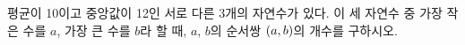 평균이 10이고 중앙값이 12인 서로 다른 3개의 자연수가 있다. 이 세 자연수 중 가장 작은 수를 $a$, 가장 큰 수를 $b$라 할 때, $a$, $b$의 순서쌍 $(a{,}\mkern3mu\mathopen{}b)$의 개수를 구하시오.
